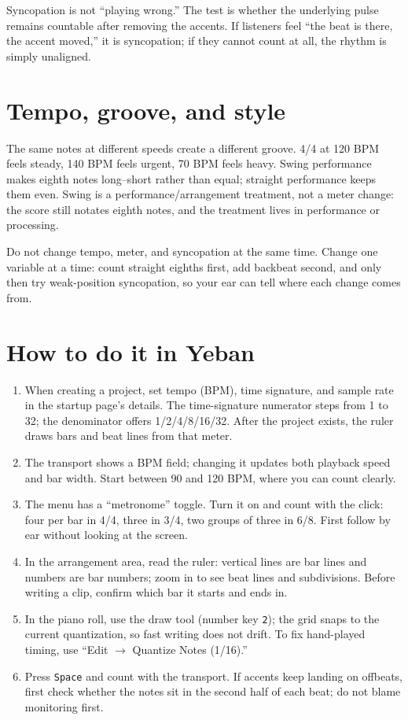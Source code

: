Syncopation is not ``playing wrong.'' The test is whether the underlying pulse remains countable after removing the accents. If listeners feel ``the beat is there, the accent moved,'' it is syncopation; if they cannot count at all, the rhythm is simply unaligned.

\section{Tempo, groove, and style}

The same notes at different speeds create a different groove. 4/4 at 120 BPM feels steady, 140 BPM feels urgent, 70 BPM feels heavy. Swing performance makes eighth notes long--short rather than equal; straight performance keeps them even. Swing is a performance/arrangement treatment, not a meter change: the score still notates eighth notes, and the treatment lives in performance or processing.

Do not change tempo, meter, and syncopation at the same time. Change one variable at a time: count straight eighths first, add backbeat second, and only then try weak-position syncopation, so your ear can tell where each change comes from.

\section{How to do it in Yeban}

\begin{enumerate}
  \item When creating a project, set tempo (BPM), time signature, and sample rate in the startup page's details. The time-signature numerator steps from 1 to 32; the denominator offers 1/2/4/8/16/32. After the project exists, the ruler draws bars and beat lines from that meter.
  \item The transport shows a BPM field; changing it updates both playback speed and bar width. Start between 90 and 120 BPM, where you can count clearly.
  \item The menu has a ``metronome'' toggle. Turn it on and count with the click: four per bar in 4/4, three in 3/4, two groups of three in 6/8. First follow by ear without looking at the screen.
  \item In the arrangement area, read the ruler: vertical lines are bar lines and numbers are bar numbers; zoom in to see beat lines and subdivisions. Before writing a clip, confirm which bar it starts and ends in.
  \item In the piano roll, use the draw tool (number key \texttt{2}); the grid snaps to the current quantization, so fast writing does not drift. To fix hand-played timing, use ``Edit $\rightarrow$ Quantize Notes (1/16).''
  \item Press \texttt{Space} and count with the transport. If accents keep landing on offbeats, first check whether the notes sit in the second half of each beat; do not blame monitoring first.
\end{enumerate}

